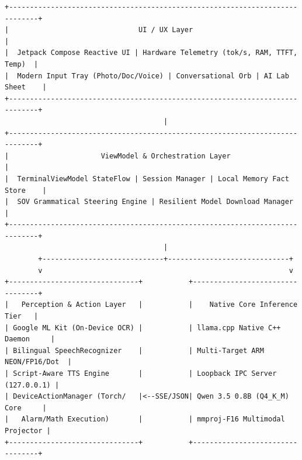 \documentclass[11pt]{article}
\begin{document}
\begin{BVerbatim}[fontsize=\small, frame=single, rulecolor=\color{ruleblue}]
+-----------------------------------------------------------------------------+
|                               UI / UX Layer                                 |
|  Jetpack Compose Reactive UI | Hardware Telemetry (tok/s, RAM, TTFT, Temp)  |
|  Modern Input Tray (Photo/Doc/Voice) | Conversational Orb | AI Lab Sheet    |
+-----------------------------------------------------------------------------+
                                      |
+-----------------------------------------------------------------------------+
|                      ViewModel & Orchestration Layer                        |
|  TerminalViewModel StateFlow | Session Manager | Local Memory Fact Store    |
|  SOV Grammatical Steering Engine | Resilient Model Download Manager         |
+-----------------------------------------------------------------------------+
                                      |
        +-----------------------------+-----------------------------+
        v                                                           v
+-------------------------------+           +---------------------------------+
|   Perception & Action Layer   |           |    Native Core Inference Tier   |
| Google ML Kit (On-Device OCR) |           | llama.cpp Native C++ Daemon     |
| Bilingual SpeechRecognizer    |           | Multi-Target ARM NEON/FP16/Dot  |
| Script-Aware TTS Engine       |           | Loopback IPC Server (127.0.0.1) |
| DeviceActionManager (Torch/   |<--SSE/JSON| Qwen 3.5 0.8B (Q4_K_M) Core     |
|   Alarm/Math Execution)       |           | mmproj-F16 Multimodal Projector |
+-------------------------------+           +---------------------------------+
\end{BVerbatim}
\end{document}
